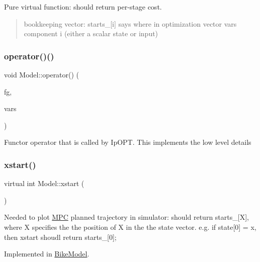 Pure virtual function\+: should return per-\/stage cost. 

\begin{quote}
bookkeeping vector\+: starts\+\_\+\mbox{[}i\mbox{]} says where in optimization vector vars component i (either a scalar state or input) \end{quote}
\mbox{\label{classModel_a138487dfb01ab6af0856c493f20ad179}} 
\subsubsection{\texorpdfstring{operator()()}{operator()()}}
{\footnotesize\ttfamily void Model\+::operator() (\begin{DoxyParamCaption}\item[{A\+D\+Vec \&}]{fg,  }\item[{const A\+D\+Vec \&}]{vars }\end{DoxyParamCaption})\hspace{0.3cm}{\ttfamily [inline]}}

Functor operator that is called by Ip\+O\+PT. This implements the low level details \mbox{\label{classModel_ab98f8c18036d9bada533325300865c5e}} 
\subsubsection{\texorpdfstring{xstart()}{xstart()}}
{\footnotesize\ttfamily virtual int Model\+::xstart (\begin{DoxyParamCaption}{ }\end{DoxyParamCaption})\hspace{0.3cm}{\ttfamily [pure virtual]}}

Needed to plot \mbox{\hyperlink{classMPC}{M\+PC}} planned trajectory in simulator\+: should return starts\+\_\+\mbox{[}X\mbox{]}, where X specifies the the position of X in the the state vector. e.\+g. if state\mbox{[}0\mbox{]} = x, then xstart shoudl return starts\+\_\+\mbox{[}0\mbox{]}; 

Implemented in \mbox{\hyperlink{classBikeModel_a920787379d6fef804f46bc1f3f885a89}{Bike\+Model}}.

\mbox{\label{classModel_ae505a277c05e465d0a41fa75d4116350}} 
